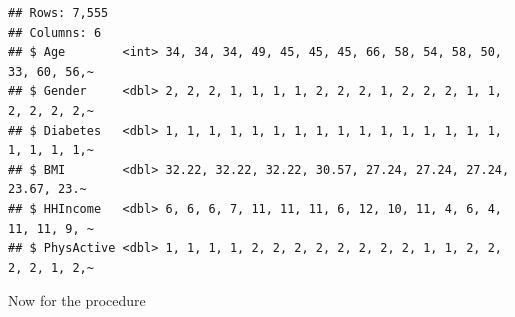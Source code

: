 \documentclass[
]{article}
\newenvironment{Shaded}{\begin{snugshade}}{\end{snugshade}}
\newcommand{\CommentTok}[1]{\textcolor[rgb]{0.56,0.35,0.01}{\textit{#1}}}
\newcommand{\FunctionTok}[1]{\textcolor[rgb]{0.00,0.00,0.00}{#1}}
\newcommand{\NormalTok}[1]{#1}
\newcommand{\OtherTok}[1]{\textcolor[rgb]{0.56,0.35,0.01}{#1}}
\newcommand{\SpecialCharTok}[1]{\textcolor[rgb]{0.00,0.00,0.00}{#1}}
\begin{document}
\begin{Shaded}
\end{Shaded}

\begin{verbatim}
## Rows: 7,555
## Columns: 6
## $ Age        <int> 34, 34, 34, 49, 45, 45, 45, 66, 58, 54, 58, 50, 33, 60, 56,~
## $ Gender     <dbl> 2, 2, 2, 1, 1, 1, 1, 2, 2, 2, 1, 2, 2, 2, 1, 1, 2, 2, 2, 2,~
## $ Diabetes   <dbl> 1, 1, 1, 1, 1, 1, 1, 1, 1, 1, 1, 1, 1, 1, 1, 1, 1, 1, 1, 1,~
## $ BMI        <dbl> 32.22, 32.22, 32.22, 30.57, 27.24, 27.24, 27.24, 23.67, 23.~
## $ HHIncome   <dbl> 6, 6, 6, 7, 11, 11, 11, 6, 12, 10, 11, 4, 6, 4, 11, 11, 9, ~
## $ PhysActive <dbl> 1, 1, 1, 1, 2, 2, 2, 2, 2, 2, 2, 2, 1, 1, 2, 2, 2, 2, 1, 2,~
\end{verbatim}

Now for the procedure
\end{document}
